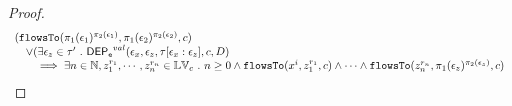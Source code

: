 \begin{proof}
%
$$
\begin{array}{l}
(\flowsto(\pi_1(\event_1)^{\pi_2(\event_1)}, \pi_1(\event_2)^{\pi_2(\event_2)}, c)
\\ \quad 
\lor 
(\exists \event_z \in \trace' \st 
    \eventdep^{val}(\event_x, \event_z, \trace[\event_x: \event_z], c, D)
    \\ \qquad 
    \implies 
    \exists n \in \mathbb{N}, z_1^{r_1}, \cdots, z_n^{r_n} \in \lvar_{{c}} \st n \geq 0 \land
\flowsto(x^i,  z_1^{r_1}, c) 
\land \cdots \land \flowsto(z_n^{r_n},  \pi_1(\event_z)^{\pi_2(\event_z)}, c)

\end{array}$$
\end{proof}
